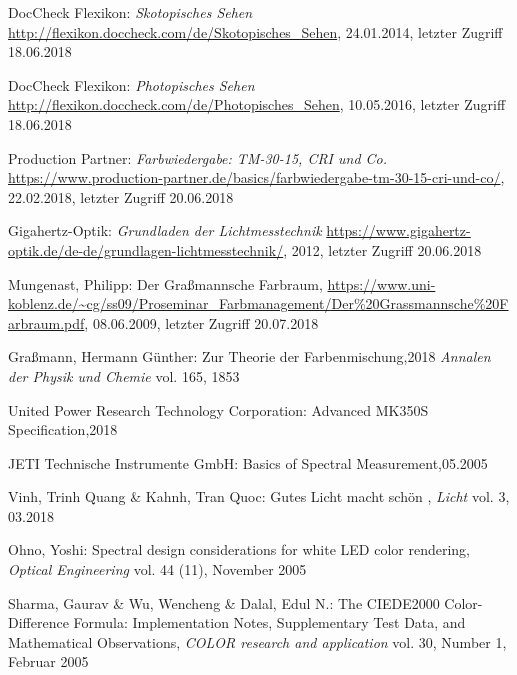 \begin{thebibliography}{}
DocCheck Flexikon:
\emph{\glqq Skotopisches Sehen\grqq}
\url{http://flexikon.doccheck.com/de/Skotopisches_Sehen}, 24.01.2014, letzter Zugriff 18.06.2018

DocCheck Flexikon:
\emph{\glqq Photopisches Sehen\grqq}
\url{http://flexikon.doccheck.com/de/Photopisches_Sehen}, 10.05.2016, letzter Zugriff 18.06.2018

Production Partner:
\emph{\glqq Farbwiedergabe: TM-30-15, CRI und Co.\grqq}
\url{https://www.production-partner.de/basics/farbwiedergabe-tm-30-15-cri-und-co/}, 22.02.2018, letzter Zugriff 20.06.2018

Gigahertz-Optik:
\emph{\glqq Grundladen der Lichtmesstechnik\grqq}
\url{https://www.gigahertz-optik.de/de-de/grundlagen-lichtmesstechnik/}, 2012, letzter Zugriff 20.06.2018



Mungenast, Philipp:
\glqq Der Graßmannsche Farbraum\grqq ,
\url{https://www.uni-koblenz.de/~cg/ss09/Proseminar_Farbmanagement/Der\%20Grassmannsche\%20Farbraum.pdf}, 08.06.2009, letzter Zugriff 20.07.2018


Graßmann, Hermann Günther:
\glqq Zur Theorie der Farbenmischung\grqq ,2018
\emph{Annalen der Physik und Chemie} vol. 165, 1853

United Power Research Technology Corporation:
\glqq Advanced MK350S Specification\grqq ,2018


JETI Technische Instrumente GmbH:
\glqq Basics of Spectral Measurement\grqq ,05.2005

Vinh, Trinh Quang \& Kahnh, Tran Quoc:
\glqq Gutes Licht macht schön \grqq, 
\emph{Licht} vol. 3, 03.2018

Ohno, Yoshi:
\glqq Spectral design considerations for white LED color rendering\grqq, 
\emph{Optical Engineering} vol. 44 (11), November 2005

Sharma, Gaurav \& Wu, Wencheng \& Dalal, Edul N.:
\glqq The CIEDE2000 Color-Difference Formula: Implementation Notes, Supplementary Test Data, and Mathematical Observations\grqq,
\emph{COLOR research and application} vol. 30, Number 1, Februar 2005


\end{thebibliography}
